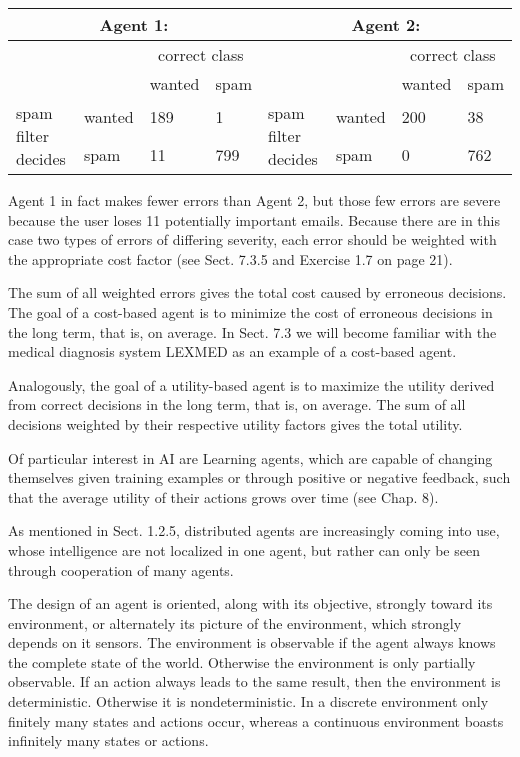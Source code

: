 \documentclass[10pt]{article}
\begin{document}
\begin{center}
\begin{tabular}{|l|l|l|l|l|l|l|l|}
\hline
\multicolumn{4}{|c|}{Agent 1:} & \multicolumn{4}{|c|}{Agent 2:} \\
\hline
\multicolumn{2}{|c|}{\multirow{2}{*}{}} & \multicolumn{2}{|c|}{correct class} & \multicolumn{2}{|c|}{\multirow{2}{*}{}} & \multicolumn{2}{|c|}{correct class} \\
\hline
 &  & wanted & spam &  &  & wanted & spam \\
\hline
\multirow{2}{*}{spam filter decides} & wanted & 189 & 1 & \multirow{2}{*}{spam filter decides} & wanted & 200 & 38 \\
\hline
 & spam & 11 & 799 &  & spam & 0 & 762 \\
\hline
\end{tabular}
\end{center}

Agent 1 in fact makes fewer errors than Agent 2, but those few errors are severe because the user loses 11 potentially important emails. Because there are in this case two types of errors of differing severity, each error should be weighted with the appropriate cost factor (see Sect. 7.3.5 and Exercise 1.7 on page 21).

The sum of all weighted errors gives the total cost caused by erroneous decisions. The goal of a cost-based agent is to minimize the cost of erroneous decisions in the long term, that is, on average. In Sect. 7.3 we will become familiar with the medical diagnosis system LEXMED as an example of a cost-based agent.

Analogously, the goal of a utility-based agent is to maximize the utility derived from correct decisions in the long term, that is, on average. The sum of all decisions weighted by their respective utility factors gives the total utility.

Of particular interest in AI are Learning agents, which are capable of changing themselves given training examples or through positive or negative feedback, such that the average utility of their actions grows over time (see Chap. 8).

As mentioned in Sect. 1.2.5, distributed agents are increasingly coming into use, whose intelligence are not localized in one agent, but rather can only be seen through cooperation of many agents.

The design of an agent is oriented, along with its objective, strongly toward its environment, or alternately its picture of the environment, which strongly depends on it sensors. The 
environment is observable if the agent always knows the complete state of the world. Otherwise the environment is only partially observable. If an action always leads to the same result, then the environment is deterministic. Otherwise it is nondeterministic. In a discrete environment only finitely many states and actions occur, whereas a continuous environment boasts infinitely many states or actions.
\end{document}
